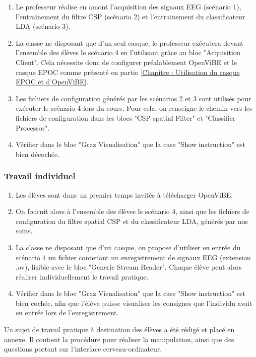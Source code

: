 \begin{enumerate}
	\item Le professeur réalise en amont l'acquisition des signaux EEG (scénario 1), l'entrainement du filtre CSP (scénario 2) et l'entrainement du classificateur LDA (scénario 3).
	\smallbreak
	\item La classe ne disposant que d'un seul casque, le professeur exécutera devant l'ensemble des élèves le scénario 4 en l'utilisant grâce au bloc "Acquisition Client". Cela nécessite donc de configurer préalablement OpenViBE et le casque EPOC comme présenté en partie \ref{Chapitre : Utilisation du casque EPOC et d'OpenViBE}.
	\smallbreak
	\item  Les fichiers de configuration générés par les scénarios 2 et 3 sont utilisés pour exécuter le  scénario 4 lors du cours. Pour cela, on renseigne le chemin vers les fichiers de configuration dans les blocs "CSP spatial Filter" et "Classifier Processor".
	\smallbreak
	\item Vérifier dans le bloc "Graz Visualisation" que la case "Show instruction" est bien décochée.
\end{enumerate}

\subsubsection{Travail individuel}

\begin{enumerate}
	\item Les élèves sont dans un premier temps invités à télécharger OpenViBE.
	\smallbreak
	\item On fournit alors à l'ensemble des élèves le scénario 4, ainsi que les fichiers de configuration du filtre spatial CSP et du classificateur LDA, générés par nos soins.
	\smallbreak
	\item La classe ne disposant que d'un casque, on propose d'utiliser en entrée du scénario 4 un fichier contenant un enregistrement de signaux EEG (extension .ov), lisible avec le bloc "Generic Stream Reader". Chaque élève peut alors réaliser individuellement le travail pratique. 
	\smallbreak
	\item Vérifier dans le bloc "Graz Visualisation" que la case "Show instruction" est bien cochée, afin que l'élève puisse visualiser les consignes que l'individu avait en entrée lors de l'enregistrement. 
\end{enumerate}
  

Un sujet de travail pratique à destination des élèves a été rédigé et placé en annexe. Il contient la procédure pour réaliser la manipulation, ainsi que des questions portant sur l'interface cerveau-ordinateur. 

